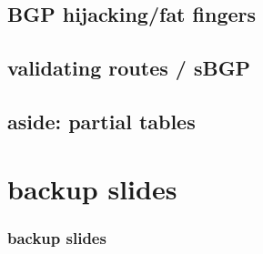 \subsection{BGP hijacking/fat fingers}


\subsection{validating routes / sBGP}



\subsection{aside: partial tables}





\section{backup slides}
\begin{frame}\frametitle{backup slides}
\end{frame}


